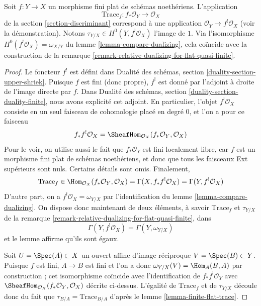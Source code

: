 \begin{lemma}
\label{lemma-compare-trace}
Soit $f : Y \to X$ un morphisme fini plat de schémas noethériens.
L'application
$$
\text{Trace}_f : f_*\mathcal{O}_Y \longrightarrow \mathcal{O}_X
$$
de la section \ref{section-discriminant}
correspond à une application $\mathcal{O}_Y \to f^!\mathcal{O}_X$ (voir la démonstration).
Notons $\tau_{Y/X} \in H^0(Y, f^!\mathcal{O}_X)$ l'image de $1$.
Via l'isomorphisme $H^0(f^!\mathcal{O}_X) = \omega_{X/Y}$ du
lemme \ref{lemma-compare-dualizing},
cela coïncide avec la construction de la
remarque \ref{remark-relative-dualizing-for-flat-quasi-finite}.
\end{lemma}

\begin{proof}
Le foncteur $f^!$ est défini dans
Dualité des schémas, section \ref{duality-section-upper-shriek}.
Puisque $f$ est fini (donc propre), $f^!$ est donné par
l'adjoint à droite de l'image directe par $f$. Dans
Dualité des schémas, section \ref{duality-section-duality-finite},
nous avons explicité cet adjoint. En particulier,
l'objet $f^!\mathcal{O}_X$ consiste en un seul
faisceau de cohomologie placé en degré $0$, et l'on a pour ce faisceau
$$
f_*f^!\mathcal{O}_X =
\SheafHom_{\mathcal{O}_X}(f_*\mathcal{O}_Y, \mathcal{O}_X)
$$
Pour le voir, on utilise aussi le fait que $f_*\mathcal{O}_Y$ est fini localement libre,
car $f$ est un morphisme fini plat de schémas noethériens,
et donc que tous les faisceaux Ext supérieurs sont nuls. Certains détails sont omis.
Finalement,
$$
\text{Trace}_f \in
\Hom_{\mathcal{O}_X}(f_*\mathcal{O}_Y, \mathcal{O}_X) =
\Gamma(X, f_*f^!\mathcal{O}_X) =
\Gamma(Y, f^!\mathcal{O}_X)
$$
D'autre part, on a $f^!\mathcal{O}_X = \omega_{Y/X}$
par l'identification du lemme \ref{lemma-compare-dualizing}.
On dispose donc maintenant de deux éléments, à savoir $\text{Trace}_f$
et $\tau_{Y/X}$ de la
remarque \ref{remark-relative-dualizing-for-flat-quasi-finite}, dans
$$
\Gamma(Y, f^!\mathcal{O}_X) = \Gamma(Y, \omega_{Y/X})
$$
et le lemme affirme qu'ils sont égaux.

\medskip\noindent
Soit $U = \Spec(A) \subset X$ un ouvert affine d'image réciproque
$V = \Spec(B) \subset Y$. Puisque $f$ est fini,
$A \to B$ est fini et l'on a donc $\omega_{Y/X}(V) = \Hom_A(B,A)$
par construction ; cet isomorphisme coïncide avec l'identification
de $f_*f^!\mathcal{O}_Y$ avec
$\SheafHom_{\mathcal{O}_X}(f_*\mathcal{O}_Y, \mathcal{O}_X)$ décrite
ci-dessus. L'égalité de $\text{Trace}_f$ et de $\tau_{Y/X}$
découle donc du fait que $\tau_{B/A} = \text{Trace}_{B/A}$
d'après le lemme \ref{lemma-finite-flat-trace}.
\end{proof}








